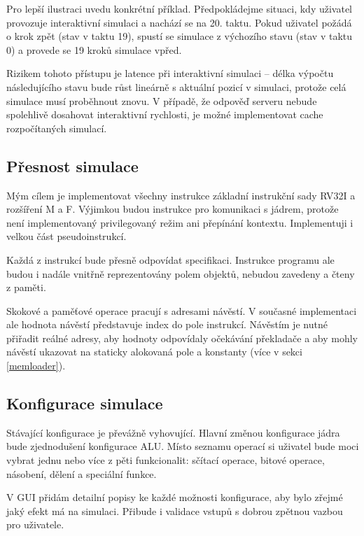 Pro lepší ilustraci uvedu konkrétní příklad.
Předpokládejme situaci, kdy uživatel provozuje interaktivní simulaci a nachází se na 20. taktu.
Pokud uživatel požádá o krok zpět (stav v taktu 19), spustí se simulace z výchozího stavu (stav v taktu 0) a provede se 19 kroků simulace vpřed.

Rizikem tohoto přístupu je latence při interaktivní simulaci -- délka výpočtu následujícího stavu bude růst lineárně s aktuální pozicí v simulaci, protože celá simulace musí proběhnout znovu.
V případě, že odpověď serveru nebude spolehlivě dosahovat interaktivní rychlosti, je možné implementovat cache rozpočítaných simulací.

\subsection{Přesnost simulace}

Mým cílem je implementovat všechny instrukce základní instrukční sady RV32I a rozšíření M a F.
Výjimkou budou instrukce pro komunikaci s jádrem, protože není implementovaný privilegovaný režim ani přepínání kontextu.
Implementuji i velkou část pseudoinstrukcí.

Každá z instrukcí bude přesně odpovídat specifikaci.
Instrukce programu ale budou i nadále vnitřně reprezentovány polem objektů, nebudou zavedeny a čteny z paměti.

Skokové a paměťové operace pracují s adresami návěstí.
V současné implementaci ale hodnota návěstí představuje index do pole instrukcí.
Návěstím je nutné přiřadit reálné adresy, aby hodnoty odpovídaly očekávání překladače a aby mohly návěstí ukazovat na staticky alokovaná pole a konstanty (více v sekci \ref{memloader}).

\subsection{Konfigurace simulace}

Stávající konfigurace je převážně vyhovující.
Hlavní změnou konfigurace jádra bude zjednodušení konfigurace ALU.
Místo seznamu operací si uživatel bude moci vybrat jednu nebo více z pěti funkcionalit: sčítací operace, bitové operace, násobení, dělení a speciální funkce.

V GUI přidám detailní popisy ke každé možnosti konfigurace, aby bylo zřejmé jaký efekt má na simulaci.
Přibude i validace vstupů s dobrou zpětnou vazbou pro uživatele.

